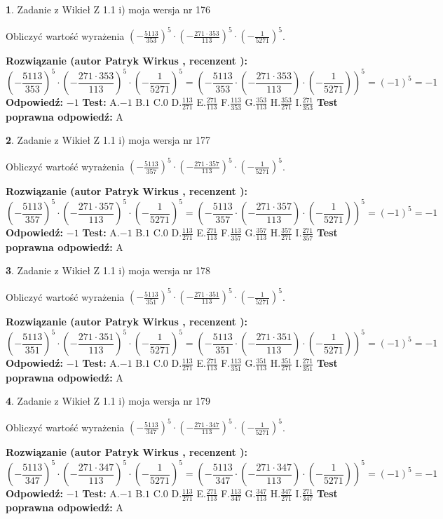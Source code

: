 \documentclass[12pt, a4paper]{article}
\theoremstyle{definition} %
\newtheorem{zad}{}
\newcommand{\zadStart}[1]{\begin{zad}#1\newline}
\newcommand{\zadStop}{\end{zad}}
\newcommand{\rozwStart}[2]{\noindent \textbf{Rozwiązanie (autor #1 , recenzent #2): }\newline}
\newcommand{\rozwStop}{\newline}
\newcommand{\odpStart}{\noindent \textbf{Odpowiedź:}\newline}
\newcommand{\odpStop}{\newline}
\newcommand{\testStart}{\noindent \textbf{Test:}\newline}
\newcommand{\testStop}{\newline}
\newcommand{\kluczStart}{\noindent \textbf{Test poprawna odpowiedź:}\newline}
\newcommand{\kluczStop}{\newline}
\begin{document}
\zadStart{Zadanie z Wikieł Z 1.1 i) moja wersja nr 176}

Obliczyć wartość wyrażenia $(-\frac{5113}{353})^{5} \cdot (-\frac{271 \cdot 353}{113})^{5} \cdot (-\frac{1}{5271})^{5}$.
\zadStop
\rozwStart{Patryk Wirkus}{}
$$(-\frac{5113}{353})^{5} \cdot (-\frac{271 \cdot 353}{113})^{5} \cdot (-\frac{1}{5271})^{5} = (-\frac{5113}{353} \cdot (-\frac{271 \cdot 353}{113}) \cdot (-\frac{1}{5271}))^{5} = (-1)^{5} = -1$$
\rozwStop
\odpStart
$-1$
\odpStop
\testStart
A.$-1$ B.$1$ C.$0$ D.$\frac{113}{271}$ E.$\frac{271}{113}$
F.$\frac{113}{353}$ G.$\frac{353}{113}$
H.$\frac{353}{271}$
I.$\frac{271}{353}$
\testStop
\kluczStart
A
\kluczStop



\zadStart{Zadanie z Wikieł Z 1.1 i) moja wersja nr 177}

Obliczyć wartość wyrażenia $(-\frac{5113}{357})^{5} \cdot (-\frac{271 \cdot 357}{113})^{5} \cdot (-\frac{1}{5271})^{5}$.
\zadStop
\rozwStart{Patryk Wirkus}{}
$$(-\frac{5113}{357})^{5} \cdot (-\frac{271 \cdot 357}{113})^{5} \cdot (-\frac{1}{5271})^{5} = (-\frac{5113}{357} \cdot (-\frac{271 \cdot 357}{113}) \cdot (-\frac{1}{5271}))^{5} = (-1)^{5} = -1$$
\rozwStop
\odpStart
$-1$
\odpStop
\testStart
A.$-1$ B.$1$ C.$0$ D.$\frac{113}{271}$ E.$\frac{271}{113}$
F.$\frac{113}{357}$ G.$\frac{357}{113}$
H.$\frac{357}{271}$
I.$\frac{271}{357}$
\testStop
\kluczStart
A
\kluczStop



\zadStart{Zadanie z Wikieł Z 1.1 i) moja wersja nr 178}

Obliczyć wartość wyrażenia $(-\frac{5113}{351})^{5} \cdot (-\frac{271 \cdot 351}{113})^{5} \cdot (-\frac{1}{5271})^{5}$.
\zadStop
\rozwStart{Patryk Wirkus}{}
$$(-\frac{5113}{351})^{5} \cdot (-\frac{271 \cdot 351}{113})^{5} \cdot (-\frac{1}{5271})^{5} = (-\frac{5113}{351} \cdot (-\frac{271 \cdot 351}{113}) \cdot (-\frac{1}{5271}))^{5} = (-1)^{5} = -1$$
\rozwStop
\odpStart
$-1$
\odpStop
\testStart
A.$-1$ B.$1$ C.$0$ D.$\frac{113}{271}$ E.$\frac{271}{113}$
F.$\frac{113}{351}$ G.$\frac{351}{113}$
H.$\frac{351}{271}$
I.$\frac{271}{351}$
\testStop
\kluczStart
A
\kluczStop



\zadStart{Zadanie z Wikieł Z 1.1 i) moja wersja nr 179}

Obliczyć wartość wyrażenia $(-\frac{5113}{347})^{5} \cdot (-\frac{271 \cdot 347}{113})^{5} \cdot (-\frac{1}{5271})^{5}$.
\zadStop
\rozwStart{Patryk Wirkus}{}
$$(-\frac{5113}{347})^{5} \cdot (-\frac{271 \cdot 347}{113})^{5} \cdot (-\frac{1}{5271})^{5} = (-\frac{5113}{347} \cdot (-\frac{271 \cdot 347}{113}) \cdot (-\frac{1}{5271}))^{5} = (-1)^{5} = -1$$
\rozwStop
\odpStart
$-1$
\odpStop
\testStart
A.$-1$ B.$1$ C.$0$ D.$\frac{113}{271}$ E.$\frac{271}{113}$
F.$\frac{113}{347}$ G.$\frac{347}{113}$
H.$\frac{347}{271}$
I.$\frac{271}{347}$
\testStop
\kluczStart
A
\kluczStop
\end{document}
